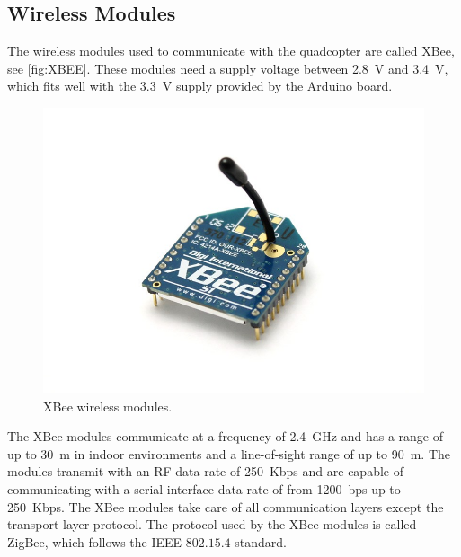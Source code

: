 \subsection{Wireless Modules}
The wireless modules used to communicate with the quadcopter are called XBee, see \autoref{fig:XBEE}. These modules need a supply voltage between \SI{2.8}{V} and \SI{3.4}{V}, which fits well with the \SI{3.3}{V} supply provided by the Arduino board\cite{XBee}.
%
\begin{figure}[H]
  \centering
  \includegraphics[scale=0.25]{figures/XBEE}
  \caption{XBee wireless modules.\cite{XBeeImage}}
  \label{fig:XBEE}
\end{figure}
%
The XBee modules communicate at a frequency of \SI{2.4}{GHz} and has a range of up to \SI{30}{m} in indoor environments and a line-of-sight range of up to \SI{90}{m}. The modules transmit with an RF data rate of \SI{250}{Kbps} and are capable of communicating with a serial interface data rate of from \SI{1200}{bps} up to \SI{250}{Kbps}. The XBee modules take care of all communication layers except the transport layer protocol. The protocol used by the XBee modules is called ZigBee, which follows the IEEE $802.15.4$ standard.\cite{XBee}
%
